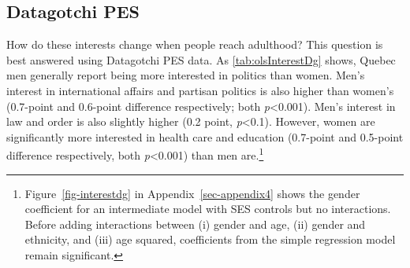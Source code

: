 \documentclass[
  letterpaper,
  DIV=11,
  numbers=noendperiod]{scrreprt}
\begin{document}
\hypertarget{datagotchi-pes}{%
\subsection{Datagotchi PES}\label{datagotchi-pes}}

How do these interests change when people reach adulthood? This question
is best answered using Datagotchi PES data. As \ref{tab:olsInterestDg}
shows, Quebec men generally report being more interested in politics
than women. Men's interest in international affairs and partisan
politics is also higher than women's (0.7-point and 0.6-point difference
respectively; both \emph{p}\textless0.001). Men's interest in law and
order is also slightly higher (0.2 point, \emph{p}\textless0.1).
However, women are significantly more interested in health care and
education (0.7-point and 0.5-point difference respectively, both
\emph{p}\textless0.001) than men are.\footnote{Figure~\ref{fig-interestdg}
  in Appendix~\ref{sec-appendix4} shows the gender coefficient for an
  intermediate model with SES controls but no interactions. Before
  adding interactions between (i) gender and age, (ii) gender and
  ethnicity, and (iii) age squared, coefficients from the simple
  regression model remain significant.}
\end{document}
